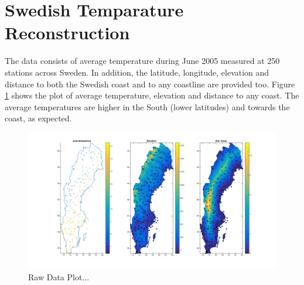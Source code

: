 \documentclass[a4paper,10pt]{article}
\begin{document}
\section{Swedish Temparature Reconstruction}
The data consists of average temperature during June 2005 measured at 250 stations across Sweden. In addition, the latitude, longitude, elevation and distance to both the Swedish coast and to any coastline are provided too. Figure \ref{fig:rawdataplot} shows the plot of average temperature, elevation and distance to any coast. The average temperatures are higher in the South (lower latitudes) and towards the coast, as expected.
\begin{figure}[ht]
	\centering
	\includegraphics[width=0.8\linewidth]{raw_data_plot.png}
	\caption{Raw Data Plot...}
	\label{fig:rawdataplot}
\end{figure}
\end{document}
